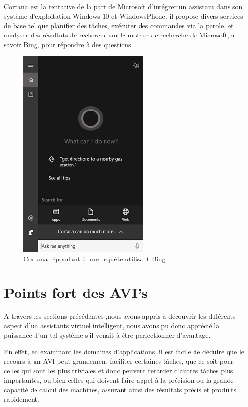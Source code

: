 \paragraph{}
Cortana est la tentative de la part de Microsoft d'intégrer un assistant dans son système d'exploitation Windows 10 et WindowsPhone, il propose divers services de base tel que planifier des tâches, exécuter des commandes via la parole, et analyser des résultats de recherche sur le moteur de recherche de Microsoft, a savoir Bing, pour répondre à des questions.
\begin{figure}[H]
	\centering
	\includegraphics[width=.4\linewidth]{images/cortana/weather.png}
	\caption{Cortana répondant à une requête utilisant Bing } 
\end{figure}

\section{Points fort des AVI's}
\paragraph{}
A travers les sections précédentes ,nous avons appris à découvrir les différents aspect d'un assistants virtuel intelligent, nous avons pu donc apprécié la puissance d'un tel système s'il venait à être perfectionner d'avantage.
\par En effet, en examinant les domaines d'applications, il est facile de déduire que le recours à un AVI peut grandement faciliter certaines tâches, que ce soit pour celles qui sont les plus triviales et donc peuvent retarder d'autres tâches plus importantes, ou bien celles qui doivent faire appel à la précision ou la grande capacité de calcul des machines, assurant ainsi des résultats précis et produits rapidement.


